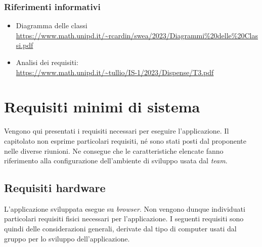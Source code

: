 \documentclass[5pt]{article}
\begin{document}
			\subsubsection{Riferimenti informativi}
			\begin{itemize}
				\item Diagramma delle classi \\ \url{https://www.math.unipd.it/~rcardin/swea/2023/Diagrammi%20delle%20Classi.pdf}
				\item Analisi dei requisiti: \\ \url{https://www.math.unipd.it/~tullio/IS-1/2023/Dispense/T3.pdf}
			\end{itemize}
        
	\section{Requisiti minimi di sistema}
		\label{sec:requisiti}
		Vengono qui presentati i requisiti necessari per eseguire l'applicazione. Il capitolato non esprime particolari requisiti, né sono stati posti dal proponente nelle diverse riunioni. 
		Ne consegue che le caratteristiche elencate fanno riferimento alla configurazione dell'ambiente di sviluppo usata dal \textit{team}.
              
		\subsection{Requisiti hardware}
			L'applicazione sviluppata esegue su \textit{browser}. Non vengono dunque individuati particolari requisiti fisici
			necessari per l'applicazione. I seguenti requisiti sono quindi delle considerazioni generali, derivate dal tipo di computer usati dal gruppo per lo sviluppo dell'applicazione. 
			\begin{table}[H]
				\centering
				\caption{Requisiti Hardware}
			\end{table}
\end{document}
